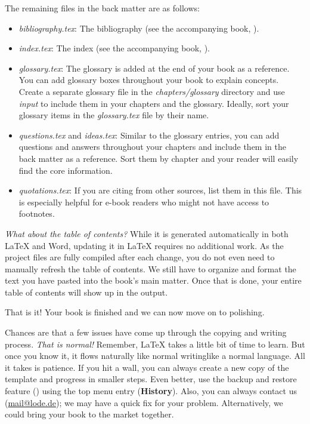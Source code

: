The remaining files in the back matter are as follows:

\begin{itemize}
    \item \textit{bibliography.tex}: The bibliography (see the accompanying book, ).
    \item \textit{index.tex}: The index (see the accompanying book, ).
    \item \textit{glossary.tex}: The glossary is added at the end of your book as a reference. You can add glossary boxes throughout your book to explain concepts. Create a separate glossary file in the \textit{chapters/glossary} directory and use \textit{input} to include them in your chapters and the glossary. Ideally, sort your glossary items in the \textit{glossary.tex} file by their name.
    \item \textit{questions.tex} and \textit{ideas.tex}: Similar to the glossary entries, you can add questions and answers throughout your chapters and include them in the back matter as a reference. Sort them by chapter and your reader will easily find the core information.
    \item \textit{quotations.tex}: If you are citing from other sources, list them in this file. This is especially helpful for e-book readers who might not have access to footnotes.
\end{itemize}


\textit{What about the table of contents?} While it is generated automatically in both LaTeX and Word, updating it in LaTeX requires no additional work. As the project files are fully compiled after each change, you do not even need to manually refresh the table of contents. We still have to organize and format the text you have pasted into the book's main matter. Once that is done, your entire table of contents will show up in the output.

That is it! Your book is finished and we can now move on to polishing. 

Chances are that a few issues have come up through the copying and writing process. \textit{That is normal!} Remember, LaTeX takes a little bit of time to learn. But once you know it, it flows naturally like normal writing\emdash{}like a normal language. All it takes is patience. If you hit a wall, you can always create a new copy of the template and progress in smaller steps. Even better, use the backup and restore feature () using the top menu entry (\textbf{History}). Also, you can always contact us (\url{mail@lode.de}); we may have a quick fix for your problem. Alternatively, we could bring your book to the market together.

